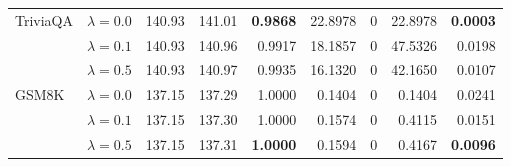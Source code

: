 \begin{table}[t]
{\begin{tabular}{l l rrrrrrr}
\midrule
TriviaQA & $\lambda{=}0.0$ & 140.93 & 141.01 & \textbf{0.9868} & 22.8978 & \cellcolor{cyan!12} $0$ & 22.8978 & \textbf{0.0003} \\
 & $\lambda{=}0.1$ & 140.93 & 140.96 & 0.9917 & 18.1857 & \cellcolor{cyan!12} $0$ & 47.5326 & 0.0198 \\
 & $\lambda{=}0.5$ & 140.93 & 140.97 & 0.9935 & 16.1320 & \cellcolor{cyan!12} $0$ & 42.1650 & 0.0107 \\
\midrule
GSM8K & $\lambda{=}0.0$ & 137.15 & 137.29 & 1.0000 & 0.1404 & \cellcolor{cyan!12} $0$ & 0.1404 & 0.0241 \\
 & $\lambda{=}0.1$ & 137.15 & 137.30 & 1.0000 & 0.1574 & \cellcolor{cyan!12} $0$ & 0.4115 & 0.0151 \\
 & $\lambda{=}0.5$ & 137.15 & 137.31 & \textbf{1.0000} & 0.1594 & \cellcolor{cyan!12} $0$ & 0.4167 & \textbf{0.0096} \\
\bottomrule
\end{tabular}}
\end{table}